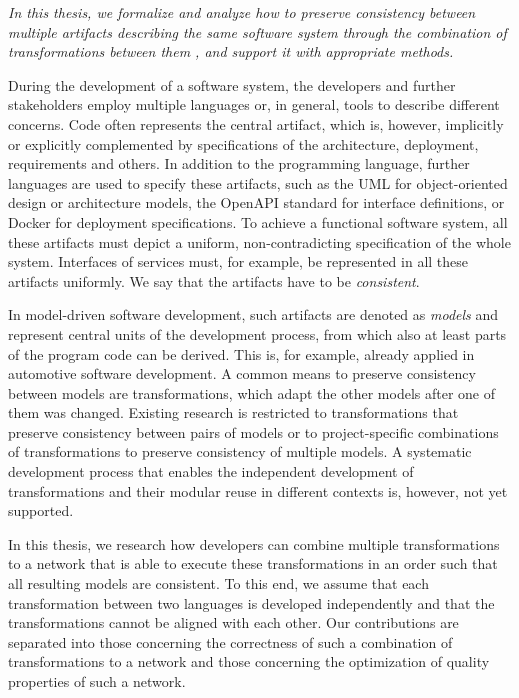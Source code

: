 \emph{In this thesis, we formalize and analyze how to preserve consistency between multiple artifacts describing the same software system through the combination of transformations between them%
, and support it with appropriate methods.}

During the development of a software system, the developers and further stakeholders employ multiple languages or, in general, tools to describe different concerns.
Code often represents the central artifact, which is, however, implicitly or explicitly complemented by specifications of the architecture, deployment, requirements and others.
In addition to the programming language, further languages are used to specify these artifacts, such as the \acrshort{UML} for object-oriented design or architecture models, the OpenAPI standard for interface definitions, or Docker for deployment specifications.
To achieve a functional software system, all these artifacts must depict a uniform, non-contradicting specification of the whole system.
Interfaces of services must, for example, be represented in all these artifacts uniformly.
We say that the artifacts have to be \emph{consistent}.

In model-driven software development, such artifacts are denoted as \emph{models} and represent central units of the development process, from which also at least parts of the program code can be derived.
This is, for example, already applied in automotive software development.
A common means to preserve consistency between models are transformations, which adapt the other models after one of them was changed.
Existing research is restricted to transformations that preserve consistency between pairs of models or to project-specific combinations of transformations to preserve consistency of multiple models. %
A systematic development process that enables the independent development of transformations and their modular reuse in different contexts is, however, not yet supported.

In this thesis, we research how developers can combine multiple transformations to a network that is able to execute these transformations in an order such that all resulting models are consistent.
To this end, we assume that each transformation between two languages is developed independently and that the transformations cannot be aligned with each other.
Our contributions are separated into those concerning the correctness of such a combination of transformations to a network and those concerning the optimization of quality properties of such a network.

